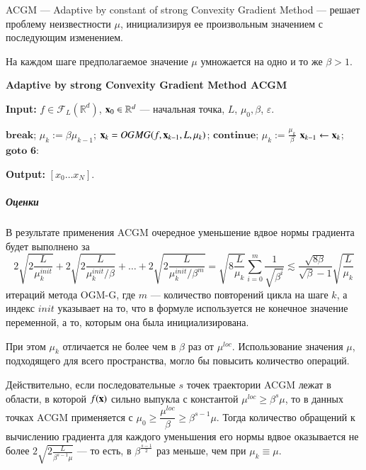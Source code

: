 \documentclass{crm-article}
\begin{document}
ACGM --- Adaptive by constant of strong Convexity Gradient Method --- решает проблему неизвестности $\mu$, инициализируя ее произвольным значением с последующим изменением.

На каждом шаге предполагаемое значение $\mu$ умножается на одно и то же $\beta>1$.

\begin{algorithm}
\caption{\bf{Adaptive by strong Convexity Gradient Method ACGM}}
\label{ACGM}
\hspace*{\algorithmicindent} \textbf{Input: } $f\in \mathcal{F}_L(\mathbb{R}^d)$, ${\bf x}_0\in\mathbb{R}^d$ --- начальная точка, $L$, $\mu_0, \beta$, $\varepsilon$.
\begin{algorithmic}[1]
\STATE $\textbf{break}$;
\ENDIF
\STATE $\mu_k:=\beta\mu_{k-1}$;
\STATE ${\bf x}_k = OGMG(f, {\bf x}_{k-1}, L, \mu_k)$;
\STATE $\textbf{continue}$;
\ENDIF
\STATE $\mu_k:=\frac{\mu_k}{\beta}$
\STATE ${\bf x}_{k-1}\leftarrow{\bf x}_k$;
\ENDIF
\STATE $\textbf{goto 6}$:
\ENDFOR
\end{algorithmic}
\hspace*{\algorithmicindent} \textbf{Output: } $[x_0\ldots x_N]$.
\end{algorithm}

\subparagraph{Оценки}

В результате применения ACGM очередное уменьшение вдвое нормы градиента будет выполнено за
$$2\sqrt{2\frac{L}{\mu_k^{init}}}+2\sqrt{2\frac{L}{\mu_k^{init}/\beta}}+\ldots+2\sqrt{2\frac{L}{\mu_k^{init}/\beta^m}} = \sqrt{8\frac{L}{\mu_k}}\sum\limits_{i=0}^m\frac{1}{\sqrt{\beta^i}} \lesssim \frac{\sqrt{8\beta}}{\sqrt{\beta}-1}\sqrt{\frac{L}{\mu_k}}$$
итераций метода OGM-G, где $m$ --- количество повторений цикла на шаге $k$, а индекс $init$ указывает на то, что в формуле используется не конечное значение переменной, а то, которым она была инициализирована.

При этом $\mu_k$ отличается не более чем в $\beta$ раз от $\mu^{loc}$. Использование значения $\mu$, подходящего для всего пространства, могло бы повысить количество операций.

Действительно, если последовательные $s$ точек траектории ACGM лежат в области, в которой $f({\bf x})$ сильно выпукла с константой $\mu^{loc}\geq \beta^s\mu$, то в данных точках ACGM применяется с $\mu_0\geq \dfrac{\mu^{loc}}{\beta}\geq \beta^{s-1}\mu$. Тогда количество обращений к вычислению градиента для каждого уменьшения его нормы вдвое оказывается не более $2\sqrt{2\frac{L}{\beta^{s-1}\mu}}$ --- то есть, в $\beta^{\frac{s-1}{2}}$ раз меньше, чем при $\mu_k\equiv\mu$.
\end{document}
